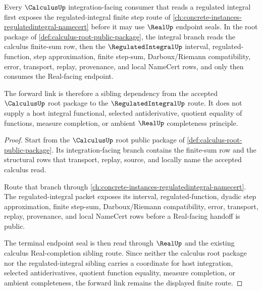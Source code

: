 \begin{theorem}
\label{thm:calculus-regulated-integral-forward-link}
Every $\CalculusUp$ integration-facing consumer that reads a regulated integral first exposes the regulated-integral finite step route of \autoref{ch:concrete-instances-regulatedintegral-namecert} before it may use $\RealUp$ endpoint seals. In the root package of \autoref{def:calculus-root-public-package}, the integral branch reads the calculus finite-sum row, then the $\RegulatedIntegralUp$ interval, regulated-function, step approximation, finite step-sum, Darboux/Riemann compatibility, error, transport, replay, provenance, and local NameCert rows, and only then consumes the Real-facing endpoint.

The forward link is therefore a sibling dependency from the accepted $\CalculusUp$ root package to the $\RegulatedIntegralUp$ route. It does not supply a host integral functional, selected antiderivative, quotient equality of functions, measure completion, or ambient $\RealUp$ completeness principle.
\end{theorem}
\begin{proof}
Start from the $\CalculusUp$ root public package of \autoref{def:calculus-root-public-package}. Its integration-facing branch contains the finite-sum row and the structural rows that transport, replay, source, and locally name the accepted calculus read.

Route that branch through \autoref{ch:concrete-instances-regulatedintegral-namecert}. The regulated-integral packet exposes its interval, regulated-function, dyadic step approximation, finite step-sum, Darboux/Riemann compatibility, error, transport, replay, provenance, and local NameCert rows before a Real-facing handoff is public.

The terminal endpoint seal is then read through $\RealUp$ and the existing calculus Real-completion sibling route. Since neither the calculus root package nor the regulated-integral sibling carries a coordinate for host integration, selected antiderivatives, quotient function equality, measure completion, or ambient completeness, the forward link remains the displayed finite route.
\end{proof}
